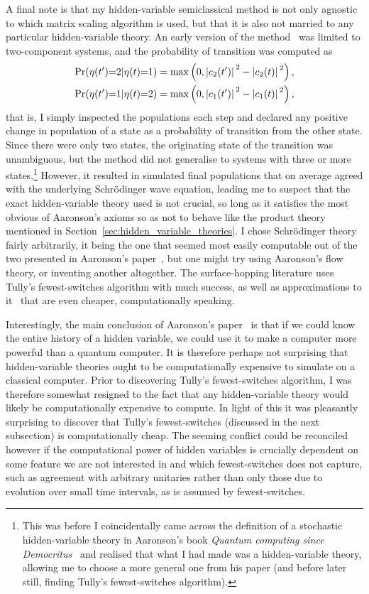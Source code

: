 A final note is that my hidden-variable semiclassical method is not only agnostic to which matrix scaling algorithm is used, but that it is also not married to any particular hidden-variable theory. An early version of the method~\cite{billington_monte_2015} was limited to two-component systems, and the probability of transition was computed as
\begin{align} 
\Pr(\eta(t^\prime){=}2|\eta(t){=}1) &=
\max\left(0, \abs{c_2(t^\prime)}^2 - \abs{c_2(t)}^2\right),\\
\Pr(\eta(t^\prime){=}1|\eta(t){=}2) &= 
\max\left(0, \abs{c_1(t^\prime)}^2 - \abs{c_1(t)}^2\right),
\end{align}
that is, I simply inspected the populations each step and declared any positive change in population of a state as a probability of transition from the other state. Since there were only two states, the originating state of the transition was unambiguous, but the method did not generalise to systems with three or more states.\footnote{This was before I coincidentally came across the definition of a stochastic hidden-variable theory in Aaronson's book \emph{Quantum computing since Democritus}~\cite{aaronson_quantum_2013} and realised that what I had made was a hidden-variable theory, allowing me to choose a more general one from his paper (and before later still, finding Tully's fewest-switches algorithm).} However, it resulted in simulated final populations that on average agreed with the underlying Schr\"odinger wave equation, leading me to suspect that the exact hidden-variable theory used is not crucial, so long as it satisfies the most obvious of Aaronson's axioms so as not to behave like the product theory mentioned in Section~\ref{sec:hidden_variable_theories}. I chose Schr\"odinger theory fairly arbitrarily, it being the one that seemed most easily computable out of the two presented in Aaronson's paper~\cite{PhysRevA.71.032325}, but one might try using Aaronson's flow theory, or inventing another altogether. The surface-hopping literature uses Tully's fewest-switches algorithm with much success, as well as approximations to it~\cite{FABIANO2008111} that are even cheaper, computationally speaking.

Interestingly, the main conclusion of Aaronson's paper~\cite{PhysRevA.71.032325} is that if we could know the entire history of a hidden variable, we could use it to make a computer more powerful than a quantum computer. It is therefore perhaps not surprising that hidden-variable theories ought to be computationally expensive to simulate on a classical computer. Prior to discovering Tully's fewest-switches algorithm, I was therefore somewhat resigned to the fact that any hidden-variable theory would likely be computationally expensive to compute. In light of this it was pleasantly surprising to discover that Tully's fewest-switches (discussed in the next subsection) is computationally cheap. The seeming conflict could be reconciled however if the computational power of hidden variables is crucially dependent on some feature we are not interested in and which fewest-switches does not capture, such as agreement with arbitrary unitaries rather than only those due to evolution over small time intervals, as is assumed by fewest-switches.

